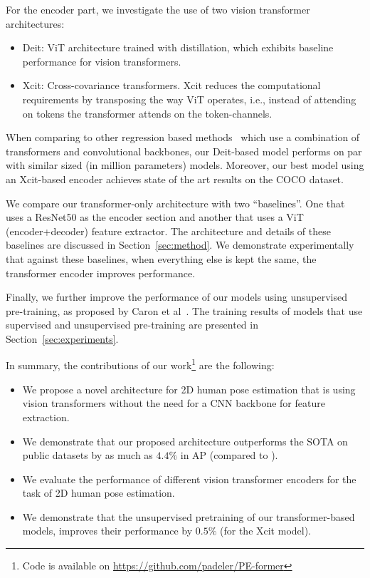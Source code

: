 \documentclass[runningheads]{llncs}
\begin{document}
For the encoder part, we investigate the use of two vision transformer architectures:
\begin{itemize}
  \item Deit\cite{touvron2021training}: ViT architecture trained with distillation, which exhibits 
  baseline performance for vision transformers.
  \item Xcit\cite{el2021xcit}: Cross-covariance transformers. Xcit reduces the computational requirements by transposing the way ViT operates, i.e., instead of attending on tokens the transformer attends on the token-channels.
\end{itemize}

When comparing to other regression based methods~\cite{li2021pose,mao2021tfpose} 
which use a combination of transformers and convolutional backbones,
our Deit-based model performs on par with similar sized (in million parameters) models.
Moreover, our best model using an Xcit-based encoder 
achieves state of the art results on the COCO dataset.

We compare our transformer-only architecture with two ``baselines''. One that uses
a ResNet50 as the encoder section and another that uses a ViT (encoder+decoder) feature extractor.
The architecture and details of these baselines are discussed in Section~\ref{sec:method}.
We demonstrate experimentally that against these baselines, when everything else is kept the same, the transformer encoder improves performance.

Finally, we further improve the performance of our models using unsupervised pre-training, as proposed 
by Caron et al~\cite{caron2021emerging}. The training results of models that use supervised and unsupervised pre-training are presented in Section~\ref{sec:experiments}. 

In summary, the contributions of our work\footnote{Code is available on \href{https://github.com/padeler/PE-former}{https://github.com/padeler/PE-former}} are the following:
\begin{itemize}
  \item We propose a novel architecture for 2D human pose estimation that is using vision transformers 
  without the need for a CNN backbone for feature extraction.
  \item We demonstrate that our proposed architecture outperforms the SOTA on public 
  datasets by as much as $4.4\%$ in AP (compared to \cite{li2021pose}).
  \item We evaluate the performance of different vision transformer encoders for the 
  task of 2D human pose estimation.
  \item We demonstrate that the unsupervised pretraining of our transformer-based models, improves their performance by $0.5\%$ (for the Xcit model).
\end{itemize}
\end{document}
